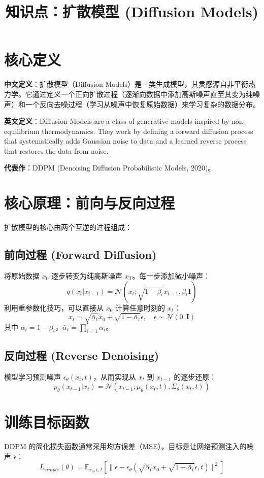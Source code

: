 \documentclass[12pt, a4paper]{article}
\title{知识点：扩散模型 (Diffusion Models)}
\author{}
\date{}
\begin{document}
\maketitle

\section{核心定义}
\textbf{中文定义}：扩散模型（Diffusion Models）是一类生成模型，其灵感源自非平衡热力学。它通过定义一个正向扩散过程（逐渐向数据中添加高斯噪声直至其变为纯噪声）和一个反向去噪过程（学习从噪声中恢复原始数据）来学习复杂的数据分布。

\textbf{英文定义}：Diffusion Models are a class of generative models inspired by non-equilibrium thermodynamics. They work by defining a forward diffusion process that systematically adds Gaussian noise to data and a learned reverse process that restores the data from noise.

\textbf{代表作}：DDPM (Denoising Diffusion Probabilistic Models, 2020)。

\section{核心原理：前向与反向过程}
扩散模型的核心由两个互逆的过程组成：

\subsection{前向过程 (Forward Diffusion)}
将原始数据 $x_0$ 逐步转变为纯高斯噪声 $x_T$。每一步添加微小噪声：
$$ q(x_t | x_{t-1}) = \mathcal{N}(x_t; \sqrt{1 - \beta_t} x_{t-1}, \beta_t \mathbf{I}) $$
利用重参数化技巧，可以直接从 $x_0$ 计算任意时刻的 $x_t$：
$$ x_t = \sqrt{\bar{\alpha}_t} x_0 + \sqrt{1 - \bar{\alpha}_t} \epsilon, \quad \epsilon \sim \mathcal{N}(0, \mathbf{I}) $$
其中 $\alpha_t = 1 - \beta_t$，$\bar{\alpha}_t = \prod_{i=1}^t \alpha_i$。

\subsection{反向过程 (Reverse Denoising)}
模型学习预测噪声 $\epsilon_\theta(x_t, t)$，从而实现从 $x_t$ 到 $x_{t-1}$ 的逐步还原：
$$ p_\theta(x_{t-1} | x_t) = \mathcal{N}(x_{t-1}; \mu_\theta(x_t, t), \Sigma_\theta(x_t, t)) $$

\section{训练目标函数}
DDPM 的简化损失函数通常采用均方误差（MSE），目标是让网络预测注入的噪声 $\epsilon$：
$$ L_{simple}(\theta) = \mathbb{E}_{x_0, \epsilon, t} \left[ \| \epsilon - \epsilon_\theta(\sqrt{\bar{\alpha}_t} x_0 + \sqrt{1 - \bar{\alpha}_t} \epsilon, t) \|^2 \right] $$
\end{document}

